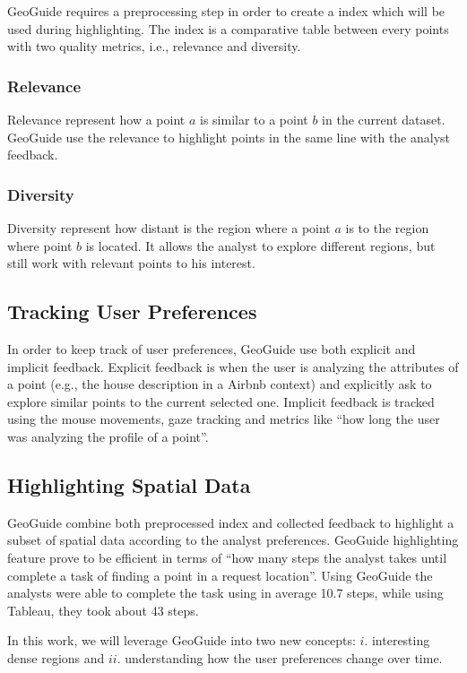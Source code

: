 GeoGuide requires a preprocessing step in order to create a index which will be used during highlighting. The index is a comparative table between every points with two quality metrics, i.e., relevance and diversity.

\subsubsection{Relevance}

Relevance represent how a point $a$ is similar to a point $b$ in the current dataset. GeoGuide use the relevance to highlight points in the same line with the analyst feedback.

\subsubsection{Diversity}

Diversity represent how distant is the region where a point $a$ is to the region where point $b$ is located. It allows the analyst to explore different regions, but still work with relevant points to his interest.

\subsection{Tracking User Preferences}

In order to keep track of user preferences, GeoGuide use both explicit and implicit feedback. Explicit feedback is when the user is analyzing the attributes of a point (e.g., the house description in a Airbnb context) and explicitly ask to explore similar points to the current selected one. Implicit feedback is tracked using the mouse movements, gaze tracking and metrics like ``how long the user was analyzing the profile of a point''.

\subsection{Highlighting Spatial Data}

GeoGuide combine both preprocessed index and collected feedback to highlight a subset of spatial data according to the analyst preferences. GeoGuide highlighting feature prove to be efficient in terms of ``how many steps the analyst takes until complete a task of finding a point in a request location''. Using GeoGuide the analysts were able to complete the task using in average 10.7 steps, while using Tableau, they took about 43 steps.

\vspace{25pt}

\noindent In this work, we will leverage GeoGuide into two new concepts: $i$. interesting dense regions and $ii$. understanding how the user preferences change over time.